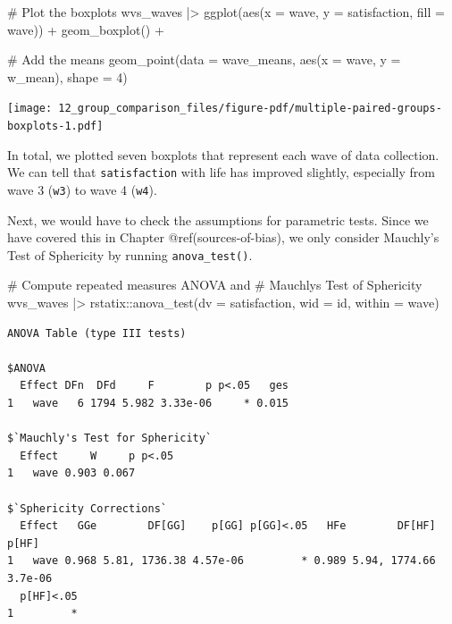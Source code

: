 \documentclass[
  letterpaper,
]{krantz}
\makeatletter
\newenvironment{Shaded}{\begin{snugshade}}{\end{snugshade}}
\newcommand{\AttributeTok}[1]{\textcolor[rgb]{0.40,0.45,0.13}{#1}}
\newcommand{\CommentTok}[1]{\textcolor[rgb]{0.37,0.37,0.37}{#1}}
\newcommand{\DecValTok}[1]{\textcolor[rgb]{0.68,0.00,0.00}{#1}}
\newcommand{\FunctionTok}[1]{\textcolor[rgb]{0.28,0.35,0.67}{#1}}
\newcommand{\NormalTok}[1]{\textcolor[rgb]{0.00,0.23,0.31}{#1}}
\newcommand{\SpecialCharTok}[1]{\textcolor[rgb]{0.37,0.37,0.37}{#1}}
\newenvironment{kframe}{%
\medskip{}
\setlength{\fboxsep}{.8em}
 \def\at@end@of@kframe{}%
 \ifinner\ifhmode%
  \def\at@end@of@kframe{\end{minipage}}%
  \begin{minipage}{\columnwidth}%
 \fi\fi%
 \def\FrameCommand##1{\hskip\@totalleftmargin \hskip-\fboxsep
 \colorbox{shadecolor}{##1}\hskip-\fboxsep
     \hskip-\linewidth \hskip-\@totalleftmargin \hskip\columnwidth}%
 \MakeFramed {\advance\hsize-\width
   \@totalleftmargin\z@ \linewidth\hsize
   \@setminipage}}%
 {\par\unskip\endMakeFramed%
 \at@end@of@kframe}
\renewenvironment{Shaded}{\begin{kframe}}{\end{kframe}}
\makeatother
\begin{document}
\begin{Shaded}
\begin{Highlighting}[]
\CommentTok{\# Plot the boxplots}
\NormalTok{wvs\_waves }\SpecialCharTok{|\textgreater{}}
  \FunctionTok{ggplot}\NormalTok{(}\FunctionTok{aes}\NormalTok{(}\AttributeTok{x =}\NormalTok{ wave,}
             \AttributeTok{y =}\NormalTok{ satisfaction,}
             \AttributeTok{fill =}\NormalTok{ wave)) }\SpecialCharTok{+}
  \FunctionTok{geom\_boxplot}\NormalTok{() }\SpecialCharTok{+}

  \CommentTok{\# Add the means}
  \FunctionTok{geom\_point}\NormalTok{(}\AttributeTok{data =}\NormalTok{ wave\_means,}
             \FunctionTok{aes}\NormalTok{(}\AttributeTok{x =}\NormalTok{ wave,}
                 \AttributeTok{y =}\NormalTok{ w\_mean),}
             \AttributeTok{shape =} \DecValTok{4}\NormalTok{)}
\end{Highlighting}
\end{Shaded}

\texttt{[image: 12\_group\_comparison\_files/figure-pdf/multiple-paired-groups-boxplots-1.pdf]}

In total, we plotted seven boxplots that represent each wave of data
collection. We can tell that \texttt{satisfaction} with life has
improved slightly, especially from wave 3 (\texttt{w3}) to wave 4
(\texttt{w4}).

Next, we would have to check the assumptions for parametric tests. Since
we have covered this in Chapter @ref(sources-of-bias), we only consider
Mauchly's Test of Sphericity by running \texttt{anova\_test()}.

\begin{Shaded}
\begin{Highlighting}[]
\CommentTok{\# Compute repeated measures ANOVA and}
\CommentTok{\# Mauchly\textquotesingle{}s Test of Sphericity}
\NormalTok{wvs\_waves }\SpecialCharTok{|\textgreater{}}
\NormalTok{  rstatix}\SpecialCharTok{::}\FunctionTok{anova\_test}\NormalTok{(}\AttributeTok{dv =}\NormalTok{ satisfaction,}
                      \AttributeTok{wid =}\NormalTok{ id,}
                      \AttributeTok{within =}\NormalTok{ wave)}
\end{Highlighting}
\end{Shaded}

\begin{verbatim}
ANOVA Table (type III tests)

$ANOVA
  Effect DFn  DFd     F        p p<.05   ges
1   wave   6 1794 5.982 3.33e-06     * 0.015

$`Mauchly's Test for Sphericity`
  Effect     W     p p<.05
1   wave 0.903 0.067      

$`Sphericity Corrections`
  Effect   GGe        DF[GG]    p[GG] p[GG]<.05   HFe        DF[HF]   p[HF]
1   wave 0.968 5.81, 1736.38 4.57e-06         * 0.989 5.94, 1774.66 3.7e-06
  p[HF]<.05
1         *
\end{verbatim}
\end{document}
